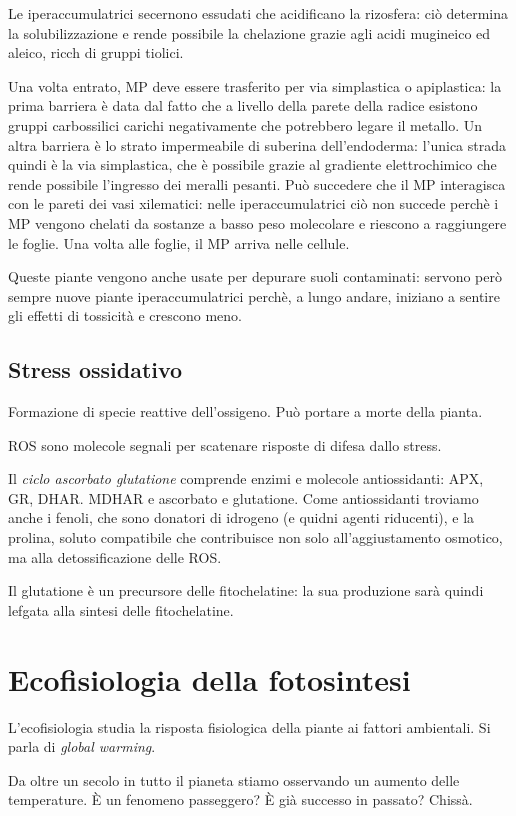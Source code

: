 \documentclass[a4paper,12pt]{book}
\begin{document}
Le iperaccumulatrici secernono essudati che acidificano la rizosfera: ciò determina la solubilizzazione e rende possibile la chelazione grazie agli acidi mugineico ed aleico, ricch di gruppi tiolici.

Una volta entrato, MP deve essere trasferito per via simplastica o apiplastica: la prima barriera è data dal fatto che a livello della parete della radice esistono gruppi carbossilici carichi negativamente che potrebbero legare il metallo. Un altra barriera è lo strato impermeabile di suberina dell'endoderma: l'unica strada quindi è la via simplastica, che è possibile grazie al gradiente elettrochimico che rende possibile l'ingresso dei meralli pesanti. Può succedere che il MP interagisca con le pareti dei vasi xilematici: nelle iperaccumulatrici ciò non succede perchè i MP vengono chelati da sostanze a basso peso molecolare e riescono a raggiungere le foglie. Una volta alle foglie, il MP arriva nelle cellule.

Queste piante vengono anche usate per depurare suoli contaminati: servono però sempre nuove piante iperaccumulatrici perchè, a lungo andare, iniziano a sentire gli effetti di tossicità e crescono meno.

\section{Stress ossidativo}
Formazione di specie reattive dell'ossigeno. Può portare a morte della pianta. 

ROS sono molecole segnali per scatenare risposte di difesa dallo stress.

Il \emph{ciclo ascorbato glutatione} comprende enzimi e molecole antiossidanti: APX, GR, DHAR. MDHAR e ascorbato e glutatione. Come antiossidanti troviamo anche i fenoli, che sono donatori di idrogeno (e quidni agenti riducenti), e la prolina, soluto compatibile che contribuisce non solo all'aggiustamento osmotico, ma alla detossificazione delle ROS.

Il glutatione è un precursore delle fitochelatine: la sua produzione sarà quindi lefgata alla sintesi delle fitochelatine.

\chapter{Ecofisiologia della fotosintesi}
L'ecofisiologia studia la risposta fisiologica della piante ai fattori ambientali. Si parla di \emph{global warming}.

Da oltre un secolo in tutto il pianeta stiamo osservando un aumento delle temperature. È un fenomeno passeggero? È  già successo in passato? Chissà. 
\end{document}
